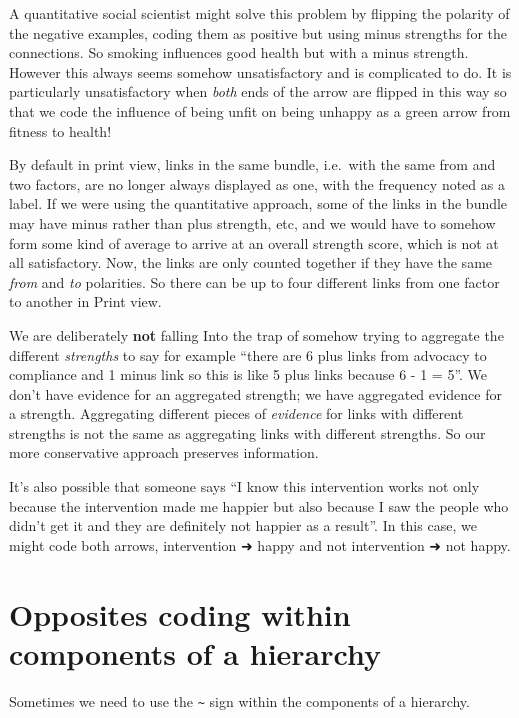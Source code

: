 \documentclass[
]{book}
\begin{document}
A quantitative social scientist might solve this problem by flipping the polarity of the negative examples, coding them as positive but using minus strengths for the connections. So smoking influences good health but with a minus strength. However this always seems somehow unsatisfactory and is complicated to do. It is particularly unsatisfactory when \emph{both} ends of the arrow are flipped in this way so that we code the influence of being unfit on being unhappy as a green arrow from fitness to health!

By default in print view, links in the same bundle, i.e.~with the same from and two factors, are no longer always displayed as one, with the frequency noted as a label. If we were using the quantitative approach, some of the links in the bundle may have minus rather than plus strength, etc, and we would have to somehow form some kind of average to arrive at an overall strength score, which is not at all satisfactory. Now, the links are only counted together if they have the same \emph{from} and \emph{to} polarities. So there can be up to four different links from one factor to another in Print view.

We are deliberately \textbf{not} falling Into the trap of somehow trying to aggregate the different \emph{strengths} to say for example ``there are 6 plus links from advocacy to compliance and 1 minus link so this is like 5 plus links because 6 - 1 = 5''. We don't have evidence for an aggregated strength; we have aggregated evidence for a strength. Aggregating different pieces of \emph{evidence} for links with different strengths is not the same as aggregating links with different strengths. So our more conservative approach preserves information.

It's also possible that someone says ``I know this intervention works not only because the intervention made me happier but also because I saw the people who didn't get it and they are definitely not happier as a result''. In this case, we might code both arrows, intervention ➜ happy and not intervention ➜ not happy.

\hypertarget{opposites-coding-within-components-of-a-hierarchy}{%
\section{Opposites coding within components of a hierarchy}\label{opposites-coding-within-components-of-a-hierarchy}}

Sometimes we need to use the \texttt{\textasciitilde{}} sign within the components of a hierarchy.
\end{document}
